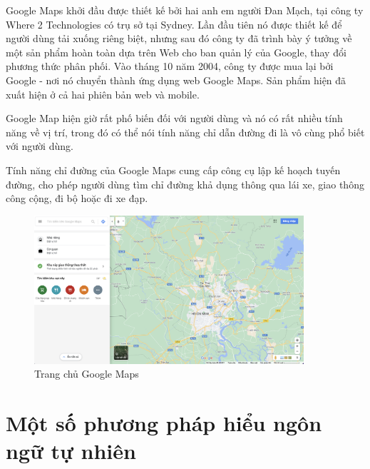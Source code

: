 Google Maps khởi đầu được thiết kế bởi hai anh em người Đan Mạch, tại công ty Where 2 Technologies có trụ sở tại Sydney. Lần đầu tiên nó được thiết kế để người dùng tải xuống riêng biệt, nhưng sau đó công ty đã trình bày ý tưởng về một sản phẩm hoàn toàn dựa trên Web cho ban quản lý của Google, thay đổi phương thức phân phối. Vào tháng 10 năm 2004, công ty được mua lại bởi Google - nơi nó chuyển thành ứng dụng web Google Maps. Sản phẩm hiện đã xuất hiện ở cả hai phiên bản web và mobile.

Google Map hiện giờ rất phố biến đối với người dùng và nó có rất nhiều tính năng về vị trí, trong đó có thể nói tính năng chỉ dẫn đường đi là vô cùng phổ biết với người dùng.

Tính năng chỉ đường của Google Maps cung cấp công cụ lập kế hoạch tuyến đường, cho phép người dùng tìm chỉ đường khả dụng thông qua lái xe, giao thông công cộng, đi bộ hoặc đi xe đạp.

\begin{figure}[htp]
    \centering
    \includegraphics[width=10cm]{images/HomePage-GoogleMaps.png}
    \caption{Trang chủ Google Maps}
    \label{fig:homepage-ggmaps}
\end{figure}

\section{Một số phương pháp hiểu ngôn ngữ tự nhiên}

